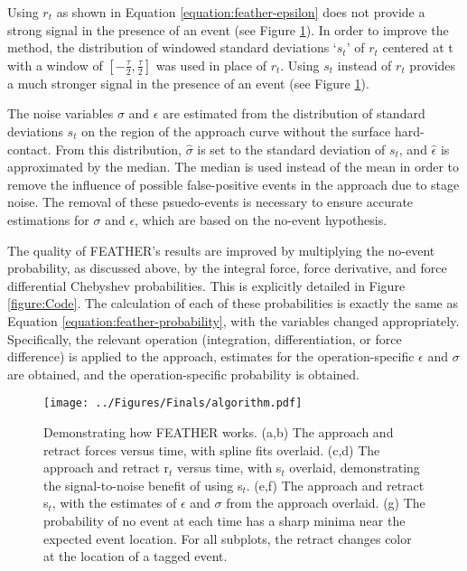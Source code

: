 \documentclass[%
  aip,12pt,tightenlines,
  amsthm,
 amsmath,amssymb
]{article}
\newcommand{\fRef}[1]{Figure \ref{figure:#1}}
\newcommand{\eRef}[1]{Equation \ref{equation:#1}}
\newcommand{\fLabel}[1]{\label{figure:#1}}
\newcommand{\pl}[0]{\vspace{6pt}}
\newcommand{\pEndF}[0]{ \\ }
\newcommand{\pStartF}[0]{ }
\newcommand{\name}[0]{FEATHER}
\newcommand{\figwidth}[0]{\linewidth}
\begin{document}
Using $r_t$ as shown in \eRef{feather-epsilon} does not provide a strong signal in the presence of an event (see \fRef{FeatherExample}). In order to improve the method, the distribution of windowed standard deviations `$s_t$' of $r_t$ centered at t with a window of $[-\frac{\tau}{2},\frac{\tau}{2}]$ was used in place of $r_t$. Using $s_t$ instead of $r_t$ provides a much stronger signal in the presence of an event (see \fRef{FeatherExample}).  \pl

The noise variables $\sigma$ and $\epsilon$ are estimated from the distribution of standard deviations $s_t$ on the region of the approach curve without the surface hard-contact. From this distribution, $\hat{\sigma}$ is set to the standard deviation of $s_t$, and $\hat{\epsilon}$ is approximated by the median. The median is used instead of the mean in order to remove the influence of possible false-positive events in the approach due to stage noise. The removal of these psuedo-events is necessary to ensure accurate estimations for $\sigma$ and $\epsilon$, which are based on the no-event hypothesis. \pl

The quality of \name{}'s results are improved by multiplying the no-event probability, as discussed above, by the integral force, force derivative, and force differential Chebyshev probabilities. This is explicitly detailed in \fRef{Code}. The calculation of each of these probabilities is exactly the same as \eRef{feather-probability}, with the variables changed appropriately. Specifically, the relevant operation (integration, differentiation, or force difference) is applied to the approach, estimates for the operation-specific $\epsilon$ and $\sigma$ are obtained, and the operation-specific probability is obtained.


\begin{figure}
\centering
\texttt{[image: ../Figures/Finals/algorithm.pdf]}%
\caption[\name{} algorithmic pipeline]{\noindent\fLabel{FeatherExample}\pStartF Demonstrating how \name{} works. (a,b) The approach and retract forces versus time, with spline fits overlaid. (c,d) The approach and retract r$_t$ versus time, with s$_t$ overlaid, demonstrating the signal-to-noise benefit of using s$_t$. (e,f) The approach and retract s$_t$, with the estimates of $\epsilon$ and $\sigma$ from the approach overlaid. (g) The probability of no event at each time has a sharp minima near the expected event location. For all subplots, the retract changes color at the location of a tagged event. \pEndF }
\end{figure}
\end{document}
